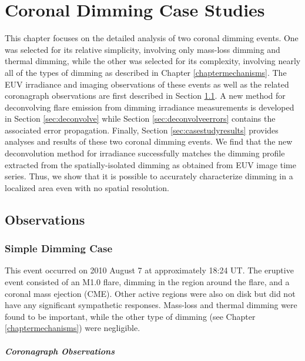 \chapter{Coronal Dimming Case Studies}
\label{chaptercasestudy}

This chapter focuses on the detailed analysis of two coronal dimming events. One was selected for its relative simplicity, involving only mass-loss dimming and thermal dimming, while the other was selected for its complexity, involving nearly all of the types of dimming as described in Chapter \ref{chaptermechanisms}. The EUV irradiance and imaging observations of these events as well as the related coronagraph observations are first described in Section \ref{sec:observations}. A new method for deconvolving flare emission from dimming irradiance measurements is developed in Section \ref{sec:deconvolve} while Section \ref{sec:deconvolveerrors} contains the associated error propagation. Finally, Section \ref{sec:casestudyresults} provides analyses and results of these two coronal dimming events. We find that the new deconvolution method for irradiance successfully matches the dimming profile extracted from the spatially-isolated dimming as obtained from EUV image time series. Thus, we show that it is possible to accurately characterize dimming in a localized area even with no spatial resolution. 

\section{Observations}
\label{sec:observations}

\subsection{Simple Dimming Case}
This event occurred on 2010 August 7 at approximately 18:24 UT. The eruptive event consisted of an M1.0 flare, dimming in the region around the flare, and a coronal mass ejection (CME). Other active regions were also on disk but did not have any significant sympathetic responses. Mass-loss and thermal dimming were found to be important, while the other type of dimming (see Chapter \ref{chaptermechanisms}) were negligible. 

\paragraph{Coronagraph Observations}

